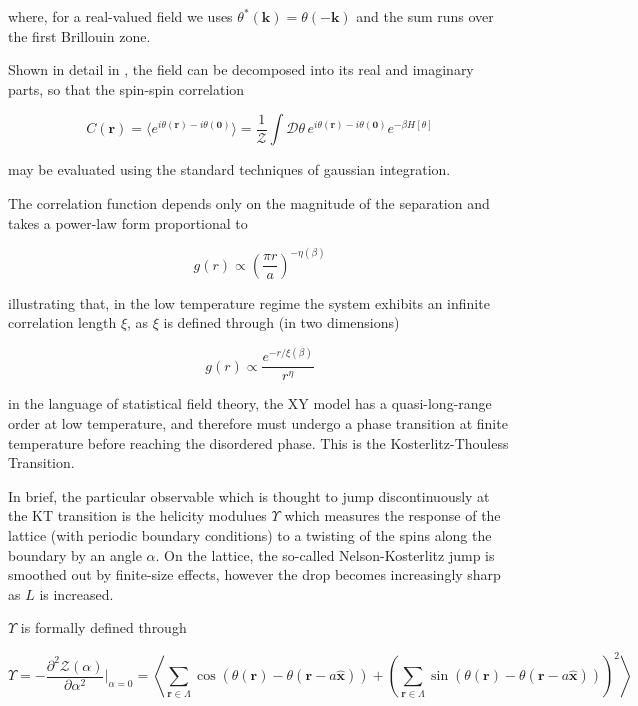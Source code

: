 \documentclass[12pt]{article}
\begin{document}
where, for a real-valued field we uses $\theta^*(\mathbf{k})=\theta(-\mathbf{k})$ and the sum runs over the first Brillouin zone.

Shown in detail in \cite{drouintouchette2022kosterlitzthoulessphasetransitionintroduction}, the field can be decomposed into its real and imaginary parts, so that the
spin-spin correlation

\begin{equation}
	C(\mathbf{r}) = \langle e^{i\theta(\mathbf{r}) - i\theta(\mathbf{0})} \rangle = \frac{1}{\mathcal{Z}} \int \mathcal{D}\theta \, e^{i\theta(\mathbf{r}) - i\theta(\mathbf{0})} e^{-\beta H[\theta]}
\end{equation}

may be evaluated using the standard techniques of gaussian integration.

The correlation function depends only on the magnitude of the separation and takes a power-law form proportional to

\begin{equation}
	g(r) \propto \left(\frac{\pi r}{a}\right)^{-\eta(\beta)}
\end{equation}

illustrating that, in the low temperature regime the system exhibits an infinite correlation length $\xi$, as $\xi$ is defined through (in two dimensions)

\begin{equation}
	g(r) \propto \frac{e^{-r/\xi(\beta)}}{r^{\eta}}
\end{equation}

in the language of statistical field theory, the XY model has a quasi-long-range order at low temperature, and therefore must undergo a phase transition
at finite temperature before reaching the disordered phase. This is the Kosterlitz-Thouless Transition. 

In brief, the particular observable which is thought to jump discontinuously at the KT transition is the helicity modulues $\Upsilon$ which measures the 
response of the lattice (with periodic boundary conditions) to a twisting of the spins along the boundary by an angle $\alpha$. On the lattice, the so-called
Nelson-Kosterlitz jump is smoothed out by finite-size effects, however the drop becomes increasingly sharp as $L$ is increased.

$\Upsilon$ is formally defined through

\begin{equation}
	\Upsilon = -\frac{\partial^2\mathcal{Z}(\alpha)}{\partial\alpha^2}\Big|_{\alpha=0} = \left\langle \sum_{\mathbf{r}\in\Lambda} \cos(\theta(\mathbf{r})-\theta(\mathbf{r}-a\hat{\mathbf{x}}))
	+\left( \sum_{\mathbf{r}\in\Lambda} \sin(\theta(\mathbf{r})-\theta(\mathbf{r}-a\hat{\mathbf{x}})) \right)^2 \right\rangle
\end{equation}
\end{document}
